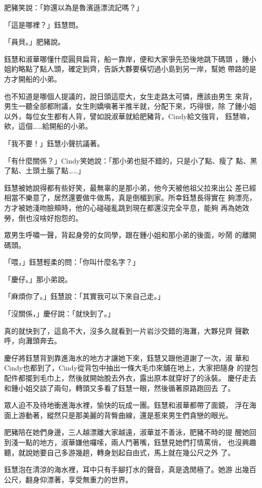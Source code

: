 肥豬笑說：「妳還以為是魯濱遜漂流記嗎？」

「這是哪裡？」鈺慧問。

「員貝。」肥豬說。

鈺慧和淑華哪懂什麼圓貝扁背，船一靠岸，便和大家爭先恐後地跳下碼頭
，鍾小姐約略點了點人頭，確定到齊，告訴大夥要橫切過小島到另一岸，幫她
帶路的是方才開船的小弟。

也不知道是哪個人提議的，說日頭這麼大，女生走路太可憐，應該由男生
來背，男生一聽全部都附議，女生則嬌嗔著半推半就，分配下來，巧得很，除
了鍾小姐以外，每位女生都有人背，譬如說淑華就給肥豬背，Cindy給文強背，
鈺慧嘛，欸，這個……給開船的小弟。

「我不要！」鈺慧小聲抗議著。

「有什麼關係？」Cindy笑她說：「那小弟也挺不錯的，只是小了點、瘦了
點、黑了點、土頭土腦了點……」

鈺慧被她說得都有些好笑，最無辜的是那小弟，他今天被他祖父拉來出公
差已經相當不樂意了，居然還要做牛做馬，真是倒楣到家。所幸鈺慧長得實在
夠漂亮，方才被她淺吻臉頰時，他的心碰碰亂跳到現在都還沒完全平息，能夠
再為她效勞，倒也沒啥好抱怨的。

眾男生呼嘯一聲，背起身旁的女同學，跟在鍾小姐和那小弟的後面，吵鬧
的離開碼頭。

「喂，」鈺慧輕柔的問：「你叫什麼名字？」

「慶仔。」那小弟說。

「麻煩你了。」鈺慧說：「其實我可以下來自己走。」

「沒關係，」慶仔說：「就快到了。」

真的就快到了，這島不大，沒多久就看到一片岩沙交錯的海灘，大夥兒齊
聲歡呼，向灘頭奔去。

慶仔將鈺慧背到靠進海水的地方才讓她下來，鈺慧又跟他道謝了一次，淑
華和Cindy也都到了，Cindy從背包中抽出一條大毛巾來舖在地上，大家把隨身
的提包配件都擺到毛巾上，然後就開始脫去外衣，露出原本就穿好了的泳裝。
慶仔走去和鍾小姐交談了兩句，轉頭又多看了鈺慧一眼，然後循著原路跑回去
了。

眾人迫不及待地衝進海水裡，愉快的玩成一團。鈺慧和淑華都帶了面鏡，
浮在海面上游動著，縱然只是那美麗的背臀曲線，還是惹來男生們貪戀的眼光。

肥豬陪在她們身邊，三人越漂離大家越遠，淑華並不善泳，肥豬不時的提
醒她回到淺一點的地方，淑華嫌他囉嗦，兩人鬥著嘴，鈺慧見她們打情罵俏，
也沒興趣聽，就說她要自己多游幾趟，轉身划起自由式，馬上就在幾公尺之外
了。

鈺慧泡在清涼的海水裡，耳中只有手腳打水的聲音，真是逸閒極了。她游
出幾百公尺，翻身仰漂著，享受無重力的世界。

